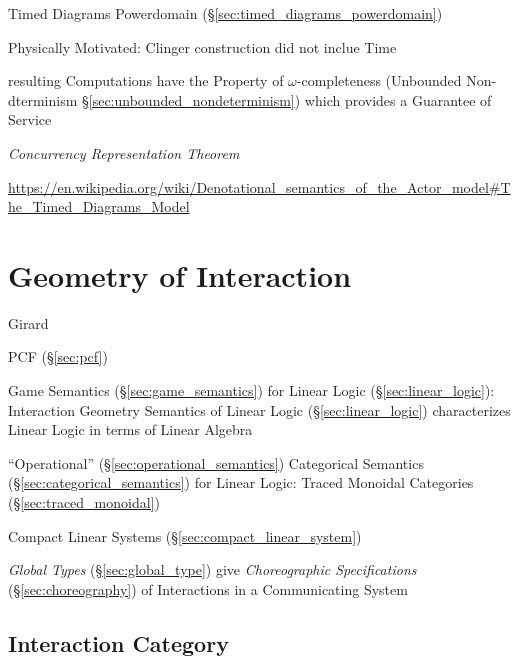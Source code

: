 Timed Diagrams Powerdomain (\S\ref{sec:timed_diagrams_powerdomain})

Physically Motivated: Clinger construction did not inclue Time

resulting Computations have the Property of $\omega$-completeness
(Unbounded Non-dterminism \S\ref{sec:unbounded_nondeterminism}) which
provides a Guarantee of Service %


\emph{Concurrency Representation Theorem} %

\url{https://en.wikipedia.org/wiki/Denotational_semantics_of_the_Actor_model#The_Timed_Diagrams_Model}


\endgroup



\section{Geometry of Interaction}\label{sec:interaction_geometry}

Girard

PCF (\S\ref{sec:pcf})

Game Semantics (\S\ref{sec:game_semantics}) for Linear Logic
(\S\ref{sec:linear_logic}): Interaction Geometry Semantics of Linear
Logic (\S\ref{sec:linear_logic}) characterizes Linear Logic in terms
of Linear Algebra


``Operational'' (\S\ref{sec:operational_semantics}) Categorical
Semantics (\S\ref{sec:categorical_semantics}) for Linear Logic: Traced
Monoidal Categories (\S\ref{sec:traced_monoidal})

Compact Linear Systems (\S\ref{sec:compact_linear_system})

\cite{abramsky-gay-nagarajan96}

\fist \emph{Global Types} (\S\ref{sec:global_type}) give
\emph{Choreographic Specifications} (\S\ref{sec:choreography}) of
Interactions in a Communicating System



\subsection{Interaction Category}\label{sec:interaction_category}
\cite{abramsky-gay-nagarajan96}

